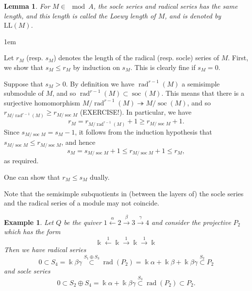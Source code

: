 \documentclass[11pt,a4paper]{article}
\makeatletter
\numberwithin{equation}{section}
\renewenvironment{proof}[1][\proofname]{\par
    \pushQED{\qed}%
    \normalfont \topsep0\p@\@plus6\p@ \labelsep1em\relax
    \trivlist
    \item[\hskip\labelsep\indent
        \bfseries #1]\ignorespaces
    \mbox{}
}{
    \popQED\endtrivlist\@endpefalse
}
\theoremstyle{all}
\newtheorem{lemma}[theorem]{Lemma}
\newtheorem{example}[theorem]{Example}
\theoremstyle{remark}
\newcommand{\soc}{\operatorname{soc}\nolimits}
\newcommand{\rad}{\operatorname{rad}\nolimits}
\newcommand{\LL}{\mathrm{LL}}
\newcommand{\defn}[1]{\textsl{\color{darkblue} #1}}
\makeatother
\begin{document}

\begin{lemma}
For $M\in\mod A$, the socle series and radical series has the same length, and this length is called the \defn{Loewy length} of $M$, and is denoted by $\LL(M)$.
\end{lemma}
\begin{proof}
Let $r_M$ (resp. $s_M$) denotes the length of the radical (resp. socle) series of $M$.
First, we show that $s_M\le r_M$ by induction on $s_M$.
This is clearly fine if $s_M=0$.

Suppose that $s_M>0$.  By definition we have $\rad^{r-1}(M)$ a semisimple submodule of $M$, and so $\rad^{r-1}(M)\subset \soc(M)$.
This means that there is a surjective homomorphism $M/\rad^{r-1}(M)\twoheadrightarrow M/\soc(M)$, and so  $r_{M/\rad^{r-1}(M)}\ge r_{M/\soc M}$ (EXERCISE!).  In particular, we have 
\[
r_M = r_{M/\rad^{r-1}(M)} + 1 \ge r_{M/\soc M} + 1.
\]
Since $s_{M/\soc M} = s_M-1$, it follows from the induction hypothesis that $s_{M/\soc M} \le r_{M/\soc M}$, and hence
\[
s_M = s_{M/\soc M} + 1 \le r_{M/\soc M} + 1 \le r_M,
\]
as required.

One can show that $r_M\le s_M$ dually.
\end{proof}

Note that the semisimple subquotients in (between the layers of) the socle series and the radical series of a module may not coincide.

\begin{example}
Let $Q$ be the quiver $1\xleftarrow{\alpha}2\xrightarrow{\beta}3\xrightarrow{\gamma}4$ and consider the projective $P_2$ which has the form
\[
\Bbbk \xleftarrow{1} \Bbbk \xrightarrow{1} \Bbbk \xrightarrow{1} \Bbbk
\]
Then we have radical series
\[
0\subset S_4=\Bbbk \beta\gamma \stackrel{S_1\oplus S_3}{\subset} \rad(P_2) = \Bbbk\alpha+\Bbbk\beta+\Bbbk\beta\gamma \stackrel{S_2}{\subset} P_2
\]
and socle series
\[
0\subset S_2\oplus S_4 = \Bbbk\alpha+\Bbbk\beta\gamma \stackrel{S_3}{\subset} \rad(P_2) \subset P_2.
\]
\end{example}


\pagebreak
%
\end{document}
